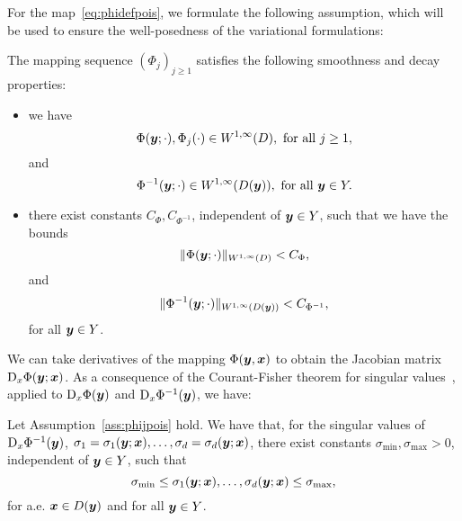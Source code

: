 For the map~\eqref{eq:phidefpois}, we formulate the following assumption, which will be used to ensure the well-posedness of the variational formulations:
\begin{assumption}\label{ass:phijpois}
The mapping sequence $(\Phi_j)_{j\geq 1}$ satisfies the following smoothness and decay properties:
\begin{itemize}
    \item we have
    \begin{equation*}
        \Phi({\bm{y}};\cdot),  \Phi_j(\cdot)\in W^{1, \infty}(D),\text{ for all }j \geq 1,
    \end{equation*}
    and
    \begin{equation*}
        \Phi^{-1}({\bm{y}};\cdot) \in W^{1, \infty}({D}({\bm{y}})),\text{ for all }{\bm{y}} \in Y.
    \end{equation*}
    \item there exist constants $C_\Phi, C_{\Phi^{-1}}$, independent of ${\bm{y}} \in Y$, such that we have the bounds
    \begin{equation*}
        \|\Phi({\bm{y}};\cdot)\|_{ W^{1, \infty}(D)}< C_\Phi,
    \end{equation*}
    and
    \begin{equation*}
        \|\Phi^{-1}({\bm{y}};\cdot)\|_{W^{1, \infty}({D}({\bm{y}}))} < C_{\Phi^{-1}},
    \end{equation*}
    for all ${\bm{y}} \in Y$.
\end{itemize}
\end{assumption}
We can take derivatives of the mapping $\Phi({\bm{y}},{{\bm{x}}})$ to obtain the Jacobian matrix $\mathop{}\!\mathrm{D}_x\Phi({\bm{y}};{{\bm{x}}})$.
As a consequence of the Courant-Fisher theorem for singular values~\cite[Thm. 3.1.2]{horn1991}, applied to $\mathop{}\!\mathrm{D}_x\Phi({\bm{y}})$ and $\mathop{}\!\mathrm{D}_x\Phi^{-1}({\bm{y}})$, we have:
\begin{lemma} \label{lem:courantfish2pois}
Let Assumption~\ref{ass:phijpois} hold.
We have that, for the singular values of $\mathop{}\!\mathrm{D}_x\Phi^{-1}({\bm{y}})$, $\sigma_1=\sigma_1({\bm{y}}; {{\bm{x}}}), \ldots, \sigma_d=\sigma_d({\bm{y}}; {{\bm{x}}})$, there exist constants $\sigma_{\min},  \sigma_{\max} > 0$, independent of ${\bm{y}} \in Y$, such that
\begin{equation*}
    \sigma_{\min} \leq \sigma_1({\bm{y}}; {{\bm{x}}}), \ldots, \sigma_d({\bm{y}}; {{\bm{x}}}) \leq \sigma_{\max},
\end{equation*}
for a.e. ${{\bm{x}}}\in {D}({\bm{y}})$ and for all ${\bm{y}} \in Y$.
\end{lemma}

